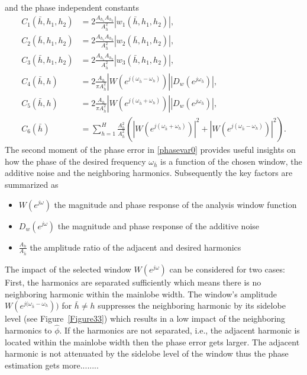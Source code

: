 and the phase independent constants 
\begin{equation}
	\begin{split}
		C_1(\bar{h},h_1,h_2)&=2\frac{A_{h_1} A_{h_2}}{A^2_{\bar{h}}}|w_1(\bar{h},h_1,h_2)|,\\
		C_2(\bar{h},h_1,h_2)&=2\frac{A_{h_1} A_{h_2}}{A^2_{\bar{h}}}|w_2(\bar{h},h_1,h_2)|,\\
		C_3(\bar{h},h_1,h_2)&=2\frac{A_{h_1} A_{h_2}}{A^2_{\bar{h}}}|w_3(\bar{h},h_1,h_2)|,\\
		C_4(\bar{h},h)&=2\frac{A_h}{\pi A^2_{\bar{h}}}|W(e^{j(\omega_{\bar{h}}-\omega_h)})||D_w(e^{j\omega_{\bar{h}}})|,\\
		C_5(\bar{h},h)&=2\frac{A_h}{\pi A^2_{\bar{h}}}|W(e^{j(\omega_{\bar{h}}+\omega_h)})||D_w(e^{j\omega_{\bar{h}}})|,\\
		C_6(\bar{h})&=\sum_{h=1}^H \frac{A_h^2}{A_{\bar{h}}^2}\left( |W(e^{j(\omega_{\bar{h}}+\omega_{{h}})})|^2+|W(e^{j(\omega_{\bar{h}}-\omega_{{h}})})|^2 \right).
	\end{split}
\end{equation}
The second moment of the phase error in \eqref{phasevar0} provides useful insights on how the phase of the desired frequency $\omega_{\bar{h}}$ is a function of the chosen window, the additive noise and the neighboring harmonics. Subsequently the key factors are summarized as
\begin{itemize}
	\item $W(e^{j\omega})$ the magnitude and phase response of the analysis window function
	\item $D_w(e^{j\omega})$ the magnitude and phase response of the additive noise
	\item $\frac{A_h}{A_{\bar{h}}}$ the amplitude ratio of the adjacent and desired harmonics
\end{itemize}
The impact of the selected window $W(e^{j\omega})$ can be considered for two cases: First, the harmonics are separated sufficiently which means there is no neighboring harmonic within the mainlobe width. The window's amplitude $W(e^{j(\omega_{\bar{h}}-\omega_h}))$ for $\bar{h}\neq h$ suppresses the neighboring harmonic by its sidelobe level (see Figure~\ref{Figure33}) which results in a low impact of the neighboring harmonics to $\hat{\phi}$. If the harmonics are not separated, i.e., the adjacent harmonic is located within the mainlobe width then the phase error gets larger. The adjacent harmonic is not attenuated by the sidelobe level of the window thus the phase estimation gets more........

